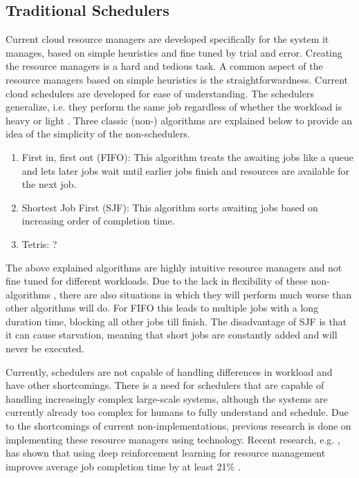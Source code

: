 \subsection{Traditional Schedulers}

Current cloud resource managers are developed specifically for the system it
manages, based on simple heuristics and fine tuned by trial and error.
Creating the resource managers is a hard and tedious task. A common aspect of
the resource managers based on simple heuristics is the straightforwardness.
Current cloud schedulers are developed for ease of understanding. The
schedulers generalize, i.e. they perform the same job regardless of whether
the workload is heavy or light \cite{mao2019}. Three classic (non-\ai)
algorithms are explained below to provide an idea of the simplicity of the
non-\ai schedulers.

\begin{enumerate}
\item First in, first out (FIFO): This algorithm treats the awaiting jobs like
    a queue and lets later jobs wait until earlier jobs finish and resources
    are available for the next job.
\item Shortest Job First (SJF): This algorithm sorts awaiting jobs based on
    increasing order of completion time.
\item Tetris: ?
\end{enumerate}

The above explained algorithms are highly intuitive resource managers and not
fine tuned for different workloads. Due to the lack in flexibility of these
non-\ai algorithms , there are also situations in which they will perform much
worse than other algorithms will do. For FIFO this leads to multiple jobs with
a long duration time, blocking all other jobs till finish. The disadvantage of
SJF is that it can cause starvation, meaning that short jobs are constantly
added and will never be executed.

Currently, schedulers are not capable of handling differences in workload and
have other shortcomings. There is a need for schedulers that are capable of
handling increasingly complex large-scale systems, although the systems are
currently already too complex for humans to fully understand and schedule. Due
to the shortcomings of current non-\ai implementations, previous research is
done on implementing these resource managers using \ai technology. Recent
research, e.g. , has shown that
using deep reinforcement learning for resource management improves average job
completion time by at least 21\% \cite{mao2019}.

